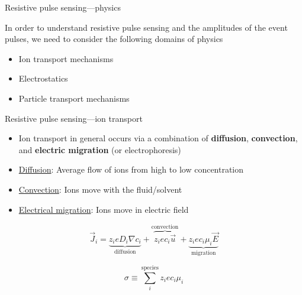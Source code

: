 		



\begin{frame}[c]{Resistive pulse sensing---physics}

	In order to understand resistive pulse sensing and the amplitudes of the event pulses, we need to consider the following domains of physics
	
	\begin{itemize}
		\item Ion transport mechanisms
		\item Electrostatics
		\item Particle transport mechanisms
	\end{itemize}

\end{frame}






\begin{frame}[c]{Resistive pulse sensing---ion transport}
	\begin{itemize}
		\item Ion transport in general occurs via a combination of \textbf{diffusion}, \textbf{convection}, and \textbf{electric migration} (or electrophoresis)
		\item \underline{Diffusion}: Average flow of ions from high to low concentration
		\item \underline{Convection}: Ions move with the fluid/solvent
		\item \underline{Electrical migration}: Ions move in electric field
	\end{itemize}
	
	
	\begin{equation} \tag{Nernst-Planck equation}
		\vec{J}_{i}=\underbrace{z_{i}eD_{i}\nabla c_{i}}_{\mathrm{diffusion}} + \overbrace{z_{i}ec_{i}\vec{u}}^{\mathrm{convection}}+\underbrace{z_{i}ec_{i}\mu_{i}\vec{E}}_{\mathrm{migration}}
	\end{equation}

	
	\begin{equation} \tag{Conductivity} 
		\sigma\equiv\sum_{i}^{\mathrm{species}} z_{i}ec_{i}\mu_{i}
	\end{equation}

	


\end{frame}


